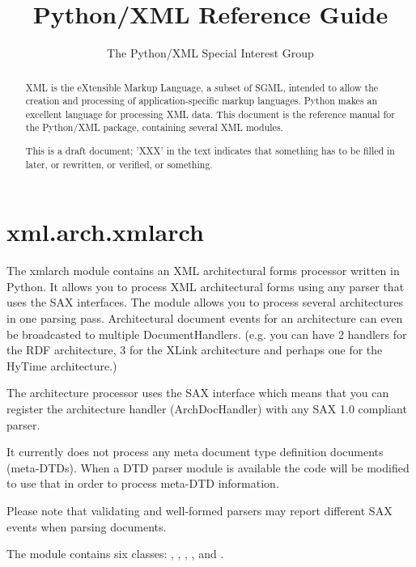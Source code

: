 \documentclass{howto}
\title{Python/XML Reference Guide}
\author{The Python/XML Special Interest Group}
\begin{document}
\maketitle

\begin{abstract}
\noindent
XML is the eXtensible Markup Language, a subset of SGML, intended to
allow the creation and processing of application-specific markup
languages.  Python makes an excellent language for processing XML
data.  This document is the reference manual for the Python/XML
package, containing several XML modules.

This is a draft document; 'XXX' in the text indicates that something
has to be filled in later, or rewritten, or verified, or something.  
\end{abstract}

\tableofcontents

\section{xml.arch.xmlarch}

The xmlarch module contains an XML architectural forms processor
   written in Python. It allows you to process XML architectural forms
   using any parser that uses the SAX interfaces. The module allows
   you to process several architectures in one parsing
   pass. Architectural document events for an architecture can even be
   broadcasted to multiple DocumentHandlers. (e.g. you can have 2
   handlers for the RDF architecture, 3 for the XLink architecture and
   perhaps one for the HyTime architecture.)
   
The architecture processor uses the SAX  interface
   which means that you can register the architecture handler
   (ArchDocHandler) with any SAX 1.0 compliant parser.
   
It currently does not process any meta document type definition
documents (meta-DTDs). When a DTD parser module is available the code
will be modified to use that in order to process meta-DTD information.
   
Please note that validating and well-formed parsers may report
different SAX events when parsing documents.

The  module contains six classes:
, , ,
,  and .
\end{document}
